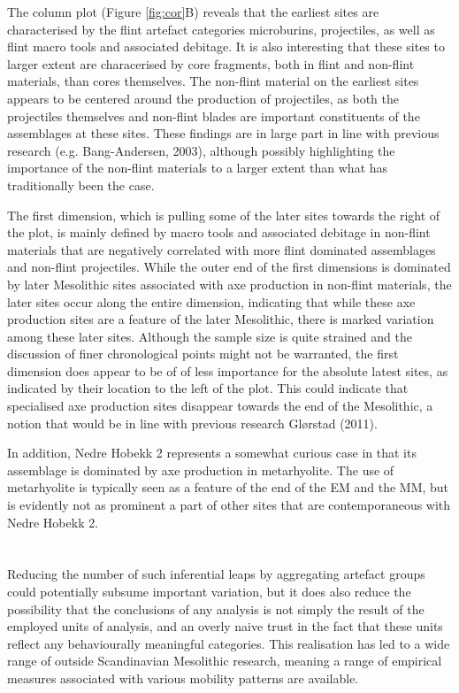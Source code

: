 \documentclass[
]{article}
\begin{document}
The column plot (Figure \ref{fig:cor}B) reveals that the earliest sites are characterised by the flint artefact categories microburins, projectiles, as well as flint macro tools and associated debitage. It is also interesting that these sites to larger extent are characerised by core fragments, both in flint and non-flint materials, than cores themselves. The non-flint material on the earliest sites appears to be centered around the production of projectiles, as both the projectiles themselves and non-flint blades are important constituents of the assemblages at these sites. These findings are in large part in line with previous research (e.g. Bang-Andersen, 2003), although possibly highlighting the importance of the non-flint materials to a larger extent than what has traditionally been the case.

The first dimension, which is pulling some of the later sites towards the right of the plot, is mainly defined by macro tools and associated debitage in non-flint materials that are negatively correlated with more flint dominated assemblages and non-flint projectiles. While the outer end of the first dimensions is dominated by later Mesolithic sites associated with axe production in non-flint materials, the later sites occur along the entire dimension, indicating that while these axe production sites are a feature of the later Mesolithic, there is marked variation among these later sites. Although the sample size is quite strained and the discussion of finer chronological points might not be warranted, the first dimension does appear to be of of less importance for the absolute latest sites, as indicated by their location to the left of the plot. This could indicate that specialised axe production sites disappear towards the end of the Mesolithic, a notion that would be in line with previous research Glørstad (2011).

In addition, Nedre Hobekk 2 represents a somewhat curious case in that its assemblage is dominated by axe production in metarhyolite. The use of metarhyolite is typically seen as a feature of the end of the EM and the MM, but is evidently not as prominent a part of other sites that are contemporaneous with Nedre Hobekk 2.

\hypertarget{section}{%
\section{}\label{section}}

Reducing the number of such inferential leaps by aggregating artefact groups could potentially subsume important variation, but it does also reduce the possibility that the conclusions of any analysis is not simply the result of the employed units of analysis, and an overly naive trust in the fact that these units reflect any behaviourally meaningful categories. This realisation has led to a wide range of outside Scandinavian Mesolithic research, meaning a range of empirical measures associated with various mobility patterns are available.
\end{document}
